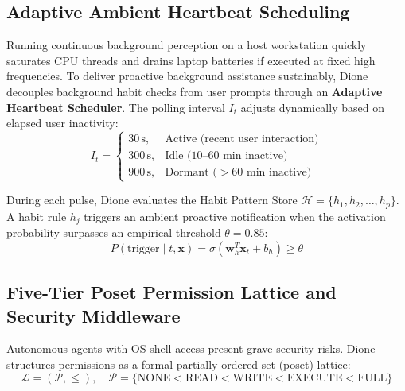 \documentclass[conference,a4paper]{IEEEtran}
\begin{document}
\subsection{Adaptive Ambient Heartbeat Scheduling}
Running continuous background perception on a host workstation quickly saturates CPU threads and drains laptop batteries if executed at fixed high frequencies. To deliver proactive background assistance sustainably, Dione decouples background habit checks from user prompts through an \textbf{Adaptive Heartbeat Scheduler}. The polling interval $I_t$ adjusts dynamically based on elapsed user inactivity:
\begin{equation}
I_t = 
\begin{cases}
    30\,\text{s}, & \text{Active (recent user interaction)} \\
    300\,\text{s}, & \text{Idle (10--60 min inactive)} \\
    900\,\text{s}, & \text{Dormant ($>60$ min inactive)}
\end{cases}
\end{equation}

During each pulse, Dione evaluates the Habit Pattern Store $\mathcal{H} = \{h_1, h_2, \dots, h_p\}$. A habit rule $h_j$ triggers an ambient proactive notification when the activation probability surpasses an empirical threshold $\theta = 0.85$:
\begin{equation}
P(\text{trigger} \mid t, \mathbf{x}) = \sigma\left(\mathbf{w}_h^T \mathbf{x}_t + b_h\right) \ge \theta
\end{equation}

\subsection{Five-Tier Poset Permission Lattice and Security Middleware}
Autonomous agents with OS shell access present grave security risks. Dione structures permissions as a formal partially ordered set (poset) lattice:
\begin{equation}
\mathcal{L} = (\mathcal{P}, \le), \quad \mathcal{P} = \{\text{NONE} < \text{READ} < \text{WRITE} < \text{EXECUTE} < \text{FULL}\}
\end{equation}
\end{document}
